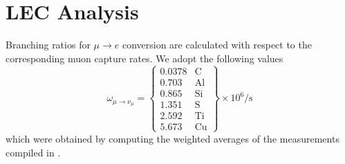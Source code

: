\documentclass{book}[12pt]
\begin{document}
\section{LEC Analysis}
Branching ratios for $\mu\rightarrow e$ conversion are calculated with respect to the corresponding muon capture rates. We adopt the following values
\begin{equation}
\omega_{\mu\rightarrow\nu_{\mu}}=\left\{\begin{array}{lr}
0.0378 & \mathrm{C}\\
0.703 & \mathrm{Al}\\
0.865 & \mathrm{Si}\\
1.351 & \mathrm{S}\\
2.592 & \mathrm{Ti}\\
5.673 & \mathrm{Cu}
\end{array}\right\}\times 10^6\mathrm{/s}
\end{equation}
which were obtained by computing the weighted averages of the measurements compiled in .
\end{document}
